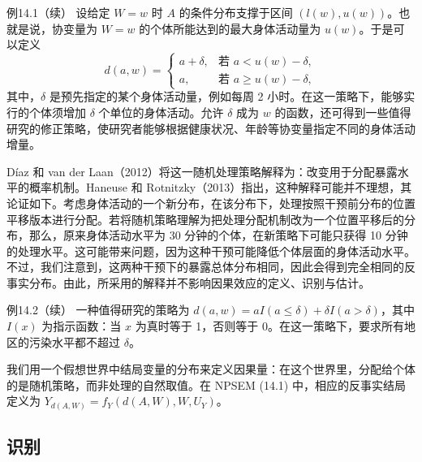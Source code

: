 \begin{bookresult}{例}{14.1（续）}
设给定 $W=w$ 时 $A$ 的条件分布支撑于区间 $(l(w),u(w))$。也就是说，协变量为 $W=w$ 的个体所能达到的最大身体活动量为 $u(w)$。于是可以定义
\begin{equation}
 d(a,w)=
 \begin{cases}
 a+\delta,&\text{若 }a<u(w)-\delta,\\
 a,&\text{若 }a\geq u(w)-\delta,
 \end{cases}
 \tag{14.3}
\end{equation}
其中，$\delta$ 是预先指定的某个身体活动量，例如每周 2 小时。在这一策略下，能够实行的个体须增加 $\delta$ 个单位的身体活动。允许 $\delta$ 成为 $w$ 的函数，还可得到一些值得研究的修正策略，使研究者能够根据健康状况、年龄等协变量指定不同的身体活动增量。

Díaz 和 van der Laan（2012）将这一随机处理策略解释为：改变用于分配暴露水平的概率机制。Haneuse 和 Rotnitzky（2013）指出，这种解释可能并不理想，其论证如下。考虑身体活动的一个新分布，在该分布下，处理按照干预前分布的位置平移版本进行分配。若将随机策略理解为把处理分配机制改为一个位置平移后的分布，那么，原来身体活动水平为 30 分钟的个体，在新策略下可能只获得 10 分钟的处理水平。这可能带来问题，因为这种干预可能降低个体层面的身体活动水平。不过，我们注意到，这两种干预下的暴露总体分布相同，因此会得到完全相同的反事实分布。由此，所采用的解释并不影响因果效应的定义、识别与估计。
\end{bookresult}

\begin{bookresult}{例}{14.2（续）}
一种值得研究的策略为 $d(a,w)=aI(a\leq\delta)+\delta I(a>\delta)$，其中 $I(x)$ 为指示函数：当 $x$ 为真时等于 1，否则等于 0。在这一策略下，要求所有地区的污染水平都不超过 $\delta$。
\end{bookresult}

我们用一个假想世界中结局变量的分布来定义因果量：在这个世界里，分配给个体的是随机策略，而非处理的自然取值。在 NPSEM (14.1) 中，相应的反事实结局定义为 $Y_{d(A,W)}=f_Y(d(A,W),W,U_Y)$。

\subsection{识别}

